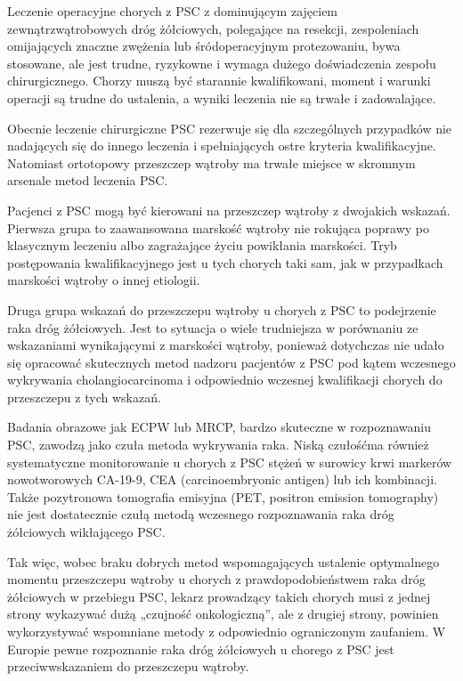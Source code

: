 Leczenie operacyjne chorych z PSC z dominującym  zajęciem  zewnątrzwątrobowych dróg żółciowych, polegające na resekcji, zespoleniach omijających znaczne zwężenia lub śródoperacyjnym protezowaniu, bywa stosowane, ale  jest  trudne,  ryzykowne  i  wymaga  dużego doświadczenia zespołu chirurgicznego. 
Chorzy muszą  być  starannie  kwalifikowani,  moment i warunki operacji są trudne do ustalenia, a wyniki leczenia nie są trwałe i zadowalające.

Obecnie  leczenie  chirurgiczne  PSC  rezerwuje się dla szczególnych przypadków nie nadających się do innego leczenia i spełniających ostre kryteria  kwalifikacyjne.  
Natomiast  ortotopowy przeszczep wątroby ma trwałe miejsce w skromnym  arsenale  metod  leczenia  PSC.  

Pacjenci z  PSC  mogą  być  kierowani  na  przeszczep  wątroby z dwojakich wskazań. 
Pierwsza grupa to zaawansowana  marskość  wątroby  nie rokująca poprawy po klasycznym leczeniu albo zagrażające życiu powikłania marskości. 
Tryb postępowania kwalifikacyjnego jest u tych chorych taki sam,  jak  w  przypadkach  marskości  wątroby o innej etiologii. 

Druga grupa wskazań do przeszczepu wątroby u chorych z PSC to podejrzenie  raka  dróg  żółciowych.  
Jest  to  sytuacja o  wiele  trudniejsza  w  porównaniu  ze  wskazaniami  wynikającymi  z  marskości  wątroby,  ponieważ dotychczas nie udało się opracować skutecznych metod nadzoru pacjentów z PSC pod kątem  wczesnego  wykrywania  cholangiocarcinoma i odpowiednio wczesnej kwalifikacji chorych  do  przeszczepu  z  tych  wskazań. 

Badania obrazowe  jak  ECPW  lub  MRCP,  bardzo  skuteczne  w  rozpoznawaniu  PSC,  zawodzą  jako czuła  metoda  wykrywania  raka.  
Niską  czułośćma  również  systematyczne  monitorowanie u chorych z PSC stężeń w surowicy krwi markerów  nowotworowych  CA-19-9,  CEA  (carcinoembryonic antigen) lub ich kombinacji. 
Także pozytronowa tomografia emisyjna (PET, positron emission tomography) nie jest dostatecznie  czułą  metodą  wczesnego  rozpoznawania raka dróg żółciowych wikłającego PSC. 

Tak więc, wobec braku dobrych metod wspomagających  ustalenie  optymalnego  momentu  przeszczepu wątroby u chorych z prawdopodobieństwem raka dróg żółciowych w przebiegu PSC, lekarz  prowadzący  takich  chorych  musi  z  jednej  strony  wykazywać  dużą  „czujność  onkologiczną”,  ale  z  drugiej  strony,  powinien  wykorzystywać wspomniane metody z odpowiednio ograniczonym  zaufaniem.  
W  Europie  pewne rozpoznanie  raka  dróg  żółciowych  u  chorego z PSC jest przeciwwskazaniem do przeszczepu wątroby. 


